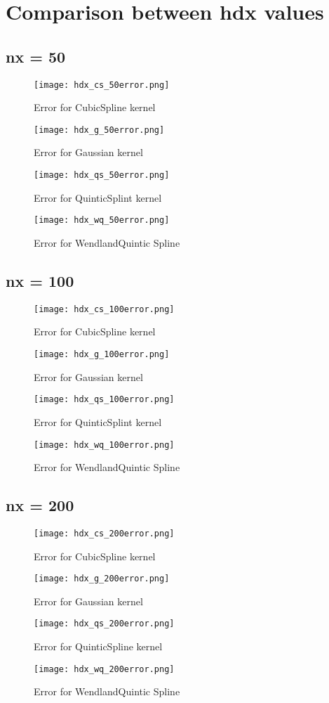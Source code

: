 \documentclass[12pt, a4paper]{report}
\begin{document}
\section{Comparison between hdx values}
\subsection{nx = 50}
\begin{figure}[H]
	\texttt{[image: hdx\_cs\_50error.png]}
	\caption{Error for CubicSpline kernel}
\end{figure}
\begin{figure}[H]
	\texttt{[image: hdx\_g\_50error.png]}
	\caption{Error for Gaussian kernel}
\end{figure}
\begin{figure}[H]
	\texttt{[image: hdx\_qs\_50error.png]}
	\caption{Error for QuinticSplint kernel}
\end{figure}
\begin{figure}[H]
	\texttt{[image: hdx\_wq\_50error.png]}
	\caption{Error for WendlandQuintic Spline}
\end{figure}

\subsection{nx = 100}
\begin{figure}[H]
	\texttt{[image: hdx\_cs\_100error.png]}
	\caption{Error for CubicSpline kernel}
\end{figure}
\begin{figure}[H]
	\texttt{[image: hdx\_g\_100error.png]}
	\caption{Error for Gaussian kernel}
\end{figure}
\begin{figure}[H]
	\texttt{[image: hdx\_qs\_100error.png]}
	\caption{Error for QuinticSplint kernel}
\end{figure}
\begin{figure}[H]
	\texttt{[image: hdx\_wq\_100error.png]}
	\caption{Error for WendlandQuintic Spline}
\end{figure}

\subsection{nx = 200}
\begin{figure}[H]
	\texttt{[image: hdx\_cs\_200error.png]}
	\caption{Error for CubicSpline kernel}
\end{figure}
\begin{figure}[H]
	\texttt{[image: hdx\_g\_200error.png]}
	\caption{Error for Gaussian kernel}
\end{figure}
\begin{figure}[H]
	\texttt{[image: hdx\_qs\_200error.png]}
	\caption{Error for QuinticSpline kernel}
\end{figure}
\begin{figure}[H]
	\texttt{[image: hdx\_wq\_200error.png]}
	\caption{Error for WendlandQuintic Spline}
\end{figure}
\end{document}
